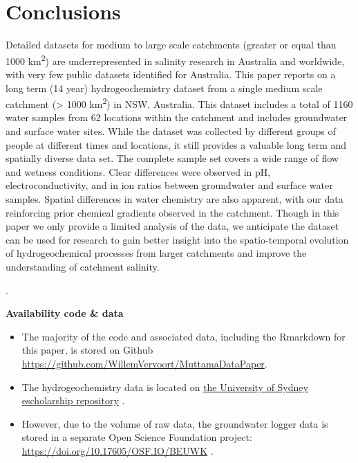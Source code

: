 \documentclass[, manuscript]{copernicus}
\providecommand{\tightlist}{%
  \setlength{\itemsep}{0pt}\setlength{\parskip}{0pt}}
\begin{document}
\section{Conclusions}

Detailed datasets for medium to large scale catchments (greater or equal
than 1000 km\textsuperscript{2}) are underrepresented in salinity
research in Australia and worldwide, with very few public datasets
identified for Australia. This paper reports on a long term (14 year)
hydrogeochemistry dataset from a single medium scale catchment
(\textgreater{} 1000 km\textsuperscript{2}) in NSW, Australia. This
dataset includes a total of 1160 water samples from 62 locations within
the catchment and includes groundwater and surface water sites. While
the dataset was collected by different groups of people at different
times and locations, it still provides a valuable long term and
spatially diverse data set. The complete sample set covers a wide range
of flow and wetness conditions. Clear differences were observed in pH,
electroconductivity, and in ion ratios between groundwater and surface
water samples. Spatial differences in water chemistry are also apparent,
with our data reinforcing prior chemical gradients observed in the
catchment. Though in this paper we only provide a limited analysis of
the data, we anticipate the dataset can be used for research to gain
better insight into the spatio-temporal evolution of hydrogeochemical
processes from larger catchments and improve the understanding of
catchment salinity.

\bigskip

.

\bigskip

\noindent \textbf{Availability code \& data}

\begin{itemize}
\tightlist
\item
  The majority of the code and associated data, including the Rmarkdown
  for this paper, is stored on Github
  \url{https://github.com/WillemVervoort/MuttamaDataPaper}.\\
\item
  The hydrogeochemistry data is located on
  \href{doi.org/10.25910/m0wp-8890}{the University of Sydney
  escholarship repository} \citet{vervoort2025}.\\
\item
  However, due to the volume of raw data, the groundwater logger data is
  stored in a separate Open Science Foundation project:
  \url{https://doi.org/10.17605/OSF.IO/BEUWK} \citet{vervoort2024}.
\end{itemize}
\end{document}
